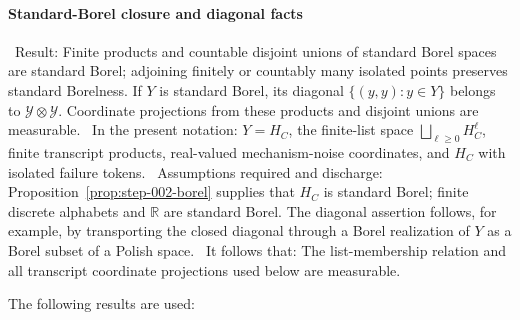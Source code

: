 \paragraph{Standard-Borel closure and diagonal facts}

\noindent\textbullet\ Result: Finite products and countable disjoint unions of standard
  Borel spaces are standard Borel; adjoining finitely or countably many
  isolated points preserves standard Borelness. If \(Y\) is standard Borel,
  its diagonal \(\{(y,y):y\in Y\}\) belongs to
  \(\mathcal Y\otimes\mathcal Y\). Coordinate projections from these
  products and disjoint unions are measurable.
\noindent\textbullet\ In the present notation: \(Y=H_C\), the finite-list space
  \(\bigsqcup_{\ell\ge0}H_C^\ell\), finite transcript products, real-valued
  mechanism-noise coordinates, and \(H_C\) with isolated failure tokens.
\noindent\textbullet\ Assumptions required and discharge: Proposition~\ref{prop:step-002-borel} supplies that \(H_C\) is standard
  Borel; finite discrete alphabets and \(\mathbb R\) are standard Borel.
  The diagonal assertion follows, for example, by transporting the closed
  diagonal through a Borel realization of \(Y\) as a Borel subset of a
  Polish space.
\noindent\textbullet\ It follows that: The list-membership relation and all transcript
  coordinate projections used below are measurable.

The following results are used:

